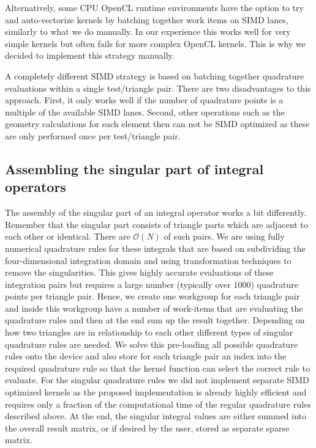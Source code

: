 Alternatively, some CPU OpenCL runtime environments have the option to try and auto-vectorize kernels by batching together work items on SIMD lanes, similarly to what we do manually. In our experience this works well for very simple kernels but often fails for more complex OpenCL kernels. This is why we decided to implement this strategy manually.

A completely different SIMD strategy is based on batching together quadrature evaluations within a single test/triangle pair. There are two disadvantages to this approach. First, it only works well if the number of quadrature points is a multiple of the available SIMD lanes. Second, other operations such as the geometry calculations for each element then can not be SIMD optimized as these are only performed once per test/triangle pair.


\subsection{Assembling the singular part of integral operators}

The assembly of the singular part of an integral operator works a bit differently. Remember that the singular part consists of triangle parts which are adjacent to each other or identical. There are $\mathcal{O}(N)$ of such pairs. We are using fully numerical quadrature rules for these integrals that are based on subdividing the four-dimensional integration domain and using transformation techniques to remove the singularities. This gives highly accurate evaluations of these integration pairs but requires a large number (typically over $1000$) quadrature points per triangle pair. Hence, we create one workgroup for each triangle pair and inside this workgroup have a number of work-items that are evaluating the quadrature rules and then at the end sum up the result together. Depending on how two triangles are in relationship to each other different types of singular quadrature rules are needed. We solve this pre-loading all possible quadrature rules onto the device and also store for each triangle pair an index into the required quadrature rule so that the kernel function can select the correct rule to evaluate. For the singular quadrature rules we did not implement separate SIMD optimized kernels as the proposed implementation is already highly efficient and requires only a fraction of the computational time of the regular quadrature rules described above. At the end, the singular integral values are either summed into the overall result matrix, or if desired by the user, stored as separate sparse matrix.

